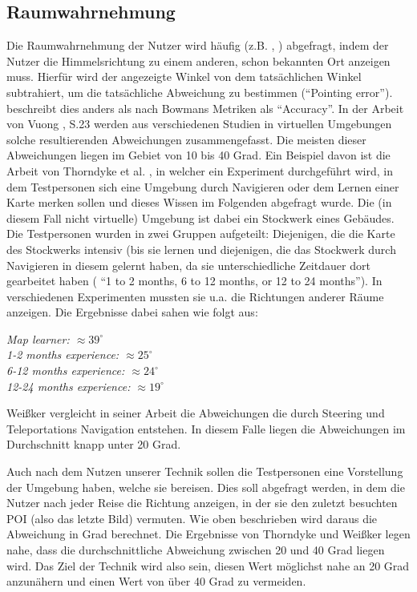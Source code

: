 \subsection{Raumwahrnehmung}
Die Raumwahrnehmung der Nutzer wird häufig (z.B. \cite{Kopper2006DesignEnvironments}, \cite{Richardson1999}) abgefragt, indem der Nutzer die Himmelsrichtung zu einem anderen, schon bekannten Ort anzeigen muss. Hierfür wird der angezeigte Winkel von dem tatsächlichen Winkel subtrahiert, um die tatsächliche Abweichung zu bestimmen (“Pointing error”). \cite{Kopper2006DesignEnvironments} beschreibt dies anders als nach Bowmans Metriken als “Accuracy”.
In der Arbeit von Vuong \cite{29_POINTING_ERROR_jennyVuong_small}, S.23 werden aus verschiedenen Studien in virtuellen Umgebungen solche resultierenden Abweichungen zusammengefasst. Die meisten dieser Abweichungen liegen im Gebiet von 10 bis 40 Grad.
Ein Beispiel davon ist die Arbeit von Thorndyke et al. \cite{Thorndyke1980LNAVIGATION}, in welcher ein Experiment durchgeführt wird, in dem Testpersonen sich eine Umgebung durch Navigieren oder dem Lernen einer Karte merken sollen und dieses Wissen im Folgenden abgefragt wurde.
Die (in diesem Fall nicht virtuelle) Umgebung ist dabei ein Stockwerk eines Gebäudes. Die Testpersonen wurden in zwei Gruppen aufgeteilt: Diejenigen, die die Karte des Stockwerks intensiv (bis sie  lernen und diejenigen, die das Stockwerk durch Navigieren in diesem gelernt haben, da sie unterschiedliche Zeitdauer dort gearbeitet haben ( “1 to 2 months, 6 to 12 months, or 12 to 24 months”).
In verschiedenen Experimenten mussten sie u.a. die Richtungen anderer Räume anzeigen.
Die Ergebnisse dabei sahen wie folgt aus: 
\begin{addmargin}[25pt]{0pt} 

\textit{Map learner: $\approx 39 ^\circ$ \\
1-2 months experience: $\approx  25 ^\circ$ \\
6-12 months experience: $\approx  24 ^\circ$ \\
12-24 months experience: $\approx  19 ^\circ$ \\}
\end{addmargin}

Weißker \cite{Weibker2018SpatialEnvironments} vergleicht in seiner Arbeit die Abweichungen die durch Steering und Teleportations Navigation entstehen. In diesem Falle liegen die Abweichungen im Durchschnitt knapp unter 20 Grad.

Auch nach dem Nutzen unserer Technik sollen die Testpersonen eine Vorstellung der Umgebung haben, welche sie bereisen. Dies soll abgefragt werden, in dem die Nutzer nach jeder Reise die Richtung anzeigen, in der sie den zuletzt besuchten POI (also das letzte Bild) vermuten. Wie oben beschrieben wird daraus die Abweichung in Grad berechnet. 
Die Ergebnisse von Thorndyke und Weißker legen nahe, dass die durchschnittliche Abweichung zwischen 20 und 40 Grad liegen wird. Das Ziel der Technik wird also sein, diesen Wert möglichst nahe an 20 Grad anzunähern und einen Wert von über 40 Grad zu vermeiden.

